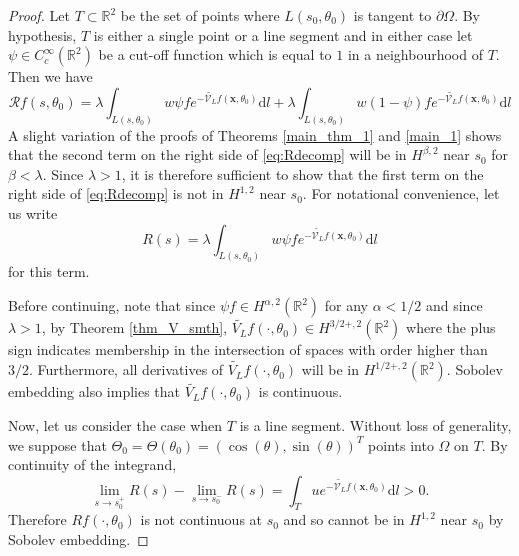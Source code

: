 \documentclass[10pt,a4paper]{amsart}
\newcommand{\dd}{\mathrm{d}}  %
\newcommand{\vx}{{\mathbf{x}}}
\begin{document}
\begin{proof}

Let $T \subset \mathbb{R}^2$ be the set of points where $L(s_0,\theta_0)$ is tangent to $\partial \Omega$. By hypothesis, $T$ is either a single point or a line segment and in either case let $\psi \in C_c^\infty(\mathbb{R}^2)$ be a cut-off function which is equal to $1$ in a neighbourhood of $T$. Then we have
\begin{equation}\label{eq:Rdecomp}
\mathcal{R}f(s,\theta_0) = \lambda \int_{L(s,\theta_0)}w \psi f e^{-\widetilde{\mathcal{V}_{L}}f(\vx,\theta_0)} \dd l + \lambda \int_{L(s,\theta_0)}w (1-\psi) f e^{-\widetilde{\mathcal{V}_{L}}f(\vx,\theta_0)} \dd l
\end{equation}
A slight variation of the proofs of Theorems \ref{main_thm_1} and \ref{main_1} shows that the second term on the right side of \eqref{eq:Rdecomp} will be in $H^{\beta,2}$ near $s_0$ for $\beta < \lambda$. Since $\lambda > 1$, it is therefore sufficient to show that the first term on the right side of \eqref{eq:Rdecomp} is not in $H^{1,2}$ near $s_0$. For notational convenience, let us write
\[
R(s) = \lambda \int_{L(s,\theta_0)}w \psi f e^{-\widetilde{\mathcal{V}_{L}}f(\vx,\theta_0)} \dd l
\]
for this term.

Before continuing, note that since $\psi f \in H^{\alpha,2}(\mathbb{R}^2)$ for any $\alpha< 1/2$ and since $\lambda > 1$, by Theorem \ref{thm_V_smth}, $\widetilde{V_L} f(\cdot,\theta_0) \in H^{3/2+,2}(\mathbb{R}^2)$ where the plus sign indicates membership in the intersection of spaces with order higher than $3/2$. Furthermore, all derivatives of $\widetilde{V_L} f(\cdot,\theta_0)$ will be in $H^{1/2+,2}(\mathbb{R}^2)$. Sobolev embedding also implies that $\widetilde{V_L} f(\cdot,\theta_0)$ is continuous.

Now, let us consider the case when $T$ is a line segment. Without loss of generality, we suppose that $\Theta_0 = \Theta(\theta_0) = (\cos(\theta),\sin(\theta))^T$ points into $\Omega$ on $T$. By continuity of the integrand,
\[
\lim_{s\rightarrow s_0^+} R(s) - \lim_{s\rightarrow s_0^-} R(s) = \int_T u e^{-\widetilde{\mathcal{V}_{L}}f(\vx,\theta_0)} \dd l > 0.
\]
Therefore $Rf(\cdot,\theta_0)$ is not continuous at $s_0$ and so cannot be in $H^{1,2}$ near $s_0$ by Sobolev embedding.


\end{proof}
\end{document}
